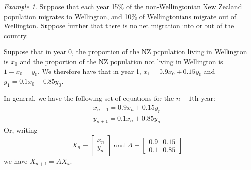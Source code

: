 \documentclass[10pt, a4paper]{amsart}
\theoremstyle{definition}
\theoremstyle{remark}
\newtheorem{ex}{Example}
\begin{document}
\begin{ex}
  Suppose that each year 15\% of the non-Wellingtonian New Zealand population migrates to Wellington, and 10\%
  of Wellingtonians migrate out of Wellington. Suppose further that there is no net migration into
  or out of the country.

  Suppose that in year 0, the proportion of the NZ population living in Wellington is $ x_0 $
  and the proportion of the NZ population not living in Wellington is $ 1 - x_0 = y_0 $.
  We therefore have that in year 1, $ x_1 = 0.9x_0 + 0.15y_0 $ and $ y_1 = 0.1x_0 + 0.85y_0 $.

  In general, we have the following set of equations for the $ n + 1$th year:
  \begin{align*}
    x_{n+1} = 0.9x_n + 0.15y_n\\
    y_{n+1} = 0.1x_n + 0.85y_n
  \end{align*}
  Or, writing
  \begin{displaymath}
    X_n = \begin{bmatrix} x_n \\ y_n \end{bmatrix} \text{ and } A = \begin{bmatrix} 0.9 & 0.15 \\ 0.1 & 0.85 \end{bmatrix}
  \end{displaymath}
  we have $ X_{n+1} = AX_n $.


\end{ex}
\end{document}
